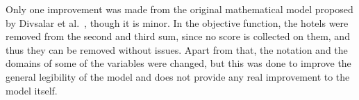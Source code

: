 

Only one improvement was made from the original mathematical model proposed by Divsalar et al.~\cite{divsalar2013}, though it is minor. In the objective function, the hotels were removed from the second and third sum, since no score is collected on them, and thus they can be removed without issues. Apart from that, the notation and the domains of some of the variables were changed, but this was done to improve the general legibility of the model and does not provide any real improvement to the model itself.